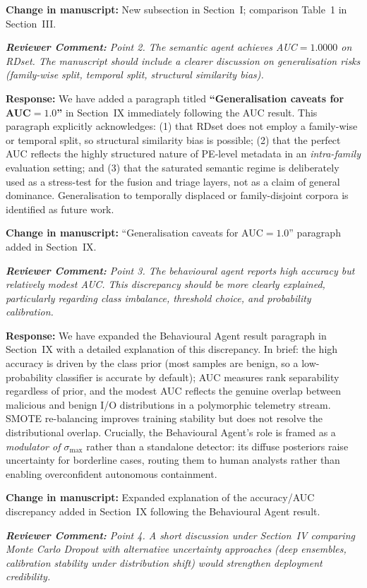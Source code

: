 \documentclass[11pt,a4paper]{article}
\newcommand{\RC}[1]{\begin{reviewbox}\textit{\textbf{Reviewer Comment:} #1}\end{reviewbox}}
\newcommand{\RS}[1]{\noindent\textcolor{responsegreen}{\textbf{Response:}} #1\par\medskip}
\newcommand{\CH}[1]{\noindent\textcolor{changebrown}{\textbf{Change in manuscript:}} #1\par\bigskip}
\begin{document}
\CH{New subsection in Section~I; comparison Table~1 in Section~III.}

\RC{Point 2. The semantic agent achieves AUC$=1.0000$ on RDset. The manuscript should
include a clearer discussion on generalisation risks (family-wise split, temporal
split, structural similarity bias).}

\RS{We have added a paragraph titled \textbf{``Generalisation caveats for
AUC$=1.0$''} in Section~IX immediately following the AUC result. This paragraph
explicitly acknowledges: (1) that RDset does not employ a family-wise or temporal
split, so structural similarity bias is possible; (2) that the perfect AUC reflects
the highly structured nature of PE-level metadata in an \emph{intra-family}
evaluation setting; and (3) that the saturated semantic regime is deliberately used
as a stress-test for the fusion and triage layers, not as a claim of general
dominance. Generalisation to temporally displaced or family-disjoint corpora is
identified as future work.}

\CH{``Generalisation caveats for AUC$=1.0$'' paragraph added in Section~IX.}

\RC{Point 3. The behavioural agent reports high accuracy but relatively modest AUC.
This discrepancy should be more clearly explained, particularly regarding class
imbalance, threshold choice, and probability calibration.}

\RS{We have expanded the Behavioural Agent result paragraph in Section~IX with a
detailed explanation of this discrepancy. In brief: the high accuracy is driven by
the class prior (most samples are benign, so a low-probability classifier is
accurate by default); AUC measures rank separability regardless of prior, and the
modest AUC reflects the genuine overlap between malicious and benign I/O distributions
in a polymorphic telemetry stream. SMOTE re-balancing improves training stability but
does not resolve the distributional overlap. Crucially, the Behavioural Agent's role
is framed as a \emph{modulator of $\sigma_{\max}$} rather than a standalone detector:
its diffuse posteriors raise uncertainty for borderline cases, routing them to human
analysts rather than enabling overconfident autonomous containment.}

\CH{Expanded explanation of the accuracy/AUC discrepancy added in Section~IX
following the Behavioural Agent result.}

\RC{Point 4. A short discussion under Section~IV comparing Monte Carlo Dropout with
alternative uncertainty approaches (deep ensembles, calibration stability under
distribution shift) would strengthen deployment credibility.}
\end{document}
